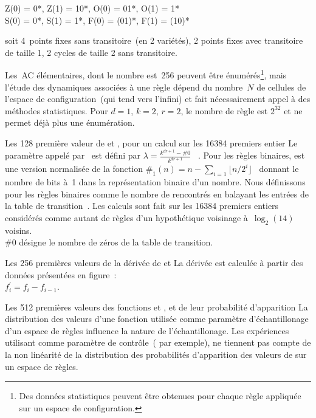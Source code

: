 \noindent Z(0) = 0*, Z(1) = 10*, O(0) = 01*, O(1) = 1*\\
S(0) = 0*, S(1) = 1*, F(0) = (01)*, F(1) = (10)*

soit 4~points fixes sans transitoire~(en 2 variétés), 2 points fixes
avec transitoire de taille 1, 2 cycles de taille 2 sans transitoire.

Les~AC élémentaires, dont le nombre est~256 peuvent être
énumérés\footnote{%
  Des données statistiques peuvent être obtenues pour
  chaque règle appliquée sur un espace de configuration.}, %
mais l'étude des dynamiques associées à une règle dépend du
nombre~$N$ de cellules de l'espace de configuration~(qui tend
vers l'infini) et fait nécessairement appel à des méthodes statistiques. %
Pour $d = 1$, $k = 2$, $r = 2$, le nombre de règle est $2^{32}$ et ne
permet déjà plus une énumération.

%
{}%
{Les 128 première valeur de \protect\alambda et \protect\Flip, pour un calcul sur les
  16384 premiers entier}%
{Le paramètre appelé \alambda par~\cite{Li90b} est défini par %
  $\lambda = \frac{k^{dr+1}-\#0}{k^{dr+1}}$~%
  . %
  Pour les règles binaires, \alambda est une version normalisée de la
  fonction $\#_{1}(n) = n - \sum_{i=1}\lfloor n/2^{i}\rfloor$~%
  \cite[]{Wolfram83} donnant le nombre de bits à~1 dans la
  représentation binaire d'un nombre. %
  Nous définissons \Flip pour les règles binaires comme le nombre de
   rencontrés en balayant les entrées de la table de
  transition~. %
  Les calculs sont fait sur les 16384 premiers entiers considérés comme
  autant de règles d'un hypothétique voisinage à~$\log_{2}(14)$
  voisins.\\
  $\#0$ désigne le nombre de zéros de la table de transition.}

%
{}%
{Les 256 premières valeurs de la dérivée de \protect\alambda et \protect\Flip}%
{La dérivée est calculée à partir des données présentées en
  figure~:\\ %
  $f^{\prime}_{i} = f_{i} - f_{i-1}$.}

%
{}%
{Les 512 premières valeurs des fonctions \protect\alambda et
  \protect\Flip, et de leur probabilité d'apparition}%
{La distribution des valeurs d'une fonction utilisée comme para\-mè\-tre
  d'échantillonage d'un espace de règles influence la nature de
  l'échan\-til\-lonage. %
  Les expériences utilisant \alambda comme paramètre de
  contrôle~(\cite{Li90b} par exemple), ne tiennent pas compte de la
  non linéarité de la distribution des probabilités d'apparition des
  valeurs de \alambda sur un espace de règles.}

